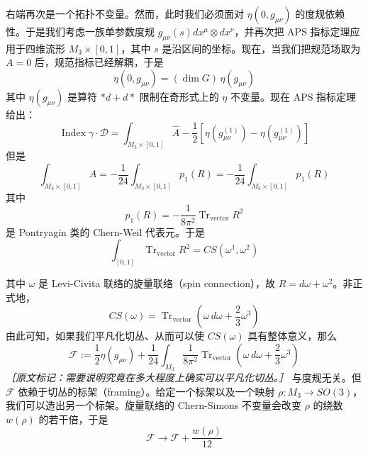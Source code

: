 右端再次是一个拓扑不变量。然而，此时我们必须面对 $\eta(0,g_{\mu\nu})$ 的度规依赖性。于是我们考虑一族单参数度规 $g_{\mu\nu}(s)dx^{\mu}\otimes dx^{\nu}$，并再次把 APS 指标定理应用于四维流形 $M_3\times[0,1]$，其中 $s$ 是沿区间的坐标。现在，当我们把规范场取为 $A=0$ 后，规范指标已经解耦，于是
\begin{equation}
  \eta(0,g_{\mu\nu})=(\dim G)\,\eta(g_{\mu\nu})
  \tag{3.25}
  \label{eq:3.25}
\end{equation}
其中 $\eta(g_{\mu\nu})$ 是算符 $*d+d*$ 限制在奇形式上的 $\eta$ 不变量。现在 APS 指标定理给出：
\begin{equation}
  \operatorname{Index}\gamma\cdot\mathcal{D}=\int_{M_3\times[0,1]}\hat{A}-\frac{1}{2}\left[\eta(g^{(1)}_{\mu\nu})-\eta(g^{(1)}_{\mu\nu})\right]
  \tag{3.26}
  \label{eq:3.26}
\end{equation}
但是
\begin{equation}
  \int_{M_3\times[0,1]}\hat{A}=-\frac{1}{24}\int_{M_3\times[0,1]}p_{1}(R)=-\frac{1}{24}\int_{M_3\times[0,1]}p_{1}(R)
  \tag{3.27}
  \label{eq:3.27}
\end{equation}
其中
\begin{equation}
  p_{1}(R)=-\frac{1}{8\pi^{2}}\operatorname{Tr}_{\mathrm{vector}}R^{2}
  \tag{3.28}
  \label{eq:3.28}
\end{equation}
是 Pontryagin 类的 Chern-Weil 代表元。于是
\begin{equation}
  \int_{[0,1]}\operatorname{Tr}_{\mathrm{vector}}R^{2}=CS(\omega^{1},\omega^{2})
  \tag{3.29}
  \label{eq:3.29}
\end{equation}

其中 $\omega$ 是 Levi-Civita 联络的旋量联络（spin connection），故 $R=d\omega+\omega^{2}$。非正式地，
\begin{equation}
  CS(\omega)=\operatorname{Tr}_{\mathrm{vector}}\left(\omega\,d\omega+\frac{2}{3}\omega^{3}\right)
  \tag{3.30}
  \label{eq:3.30}
\end{equation}
由此可知，如果我们平凡化切丛、从而可以使 $CS(\omega)$ 具有整体意义，那么
\begin{equation}
  \mathcal{F}:=\frac{1}{2}\eta(g_{\mu\nu})+\frac{1}{24}\int_{M_3}\frac{1}{8\pi^{2}}\operatorname{Tr}_{\mathrm{vector}}\left(\omega\,d\omega+\frac{2}{3}\omega^{3}\right)
  \tag{3.31}
  \label{eq:3.31}
\end{equation}
{\small\itshape ［原文标记：需要说明究竟在多大程度上确实可以平凡化切丛。］}
与度规无关。但 $\mathcal{F}$ 依赖于切丛的标架（framing）。给定一个标架以及一个映射 $\rho:M_3\to SO(3)$，我们可以造出另一个标架。旋量联络的 Chern-Simons 不变量会改变 $\rho$ 的绕数 $w(\rho)$ 的若干倍，于是
\begin{equation}
  \mathcal{F}\to\mathcal{F}+\frac{w(\rho)}{12}
  \tag{3.32}
  \label{eq:3.32}
\end{equation}

